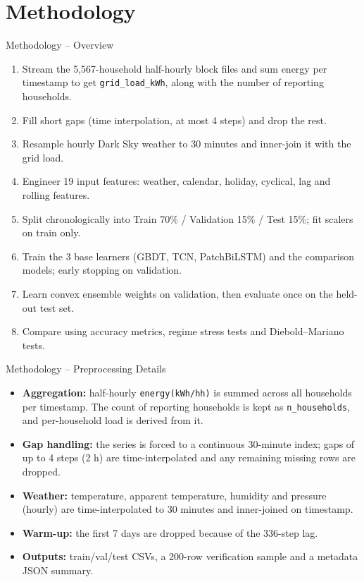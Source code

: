 \documentclass[aspectratio=169]{beamer}
\begin{document}
\section{Methodology}
\begin{frame}{Methodology -- Overview}
  \begin{enumerate}
    \item Stream the 5,567-household half-hourly block files and sum energy per timestamp to get \texttt{grid\_load\_kWh}, along with the number of reporting households.
    \item Fill short gaps (time interpolation, at most 4 steps) and drop the rest.
    \item Resample hourly Dark Sky weather to 30 minutes and inner-join it with the grid load.
    \item Engineer 19 input features: weather, calendar, holiday, cyclical, lag and rolling features.
    \item Split chronologically into Train 70\% / Validation 15\% / Test 15\%; fit scalers on train only.
    \item Train the 3 base learners (GBDT, TCN, PatchBiLSTM) and the comparison models; early stopping on validation.
    \item Learn convex ensemble weights on validation, then evaluate once on the held-out test set.
    \item Compare using accuracy metrics, regime stress tests and Diebold--Mariano tests.
  \end{enumerate}
\end{frame}

\begin{frame}{Methodology -- Preprocessing Details}
  \small
  \begin{itemize}
    \item \textbf{Aggregation:} half-hourly \texttt{energy(kWh/hh)} is summed across all households per timestamp. The count of reporting households is kept as \texttt{n\_households}, and per-household load is derived from it.
    \item \textbf{Gap handling:} the series is forced to a continuous 30-minute index; gaps of up to 4 steps (2 h) are time-interpolated and any remaining missing rows are dropped.
    \item \textbf{Weather:} temperature, apparent temperature, humidity and pressure (hourly) are time-interpolated to 30 minutes and inner-joined on timestamp.
    \item \textbf{Warm-up:} the first 7 days are dropped because of the 336-step lag.
    \item \textbf{Outputs:} train/val/test CSVs, a 200-row verification sample and a metadata JSON summary.
  \end{itemize}
\end{frame}
\end{document}
